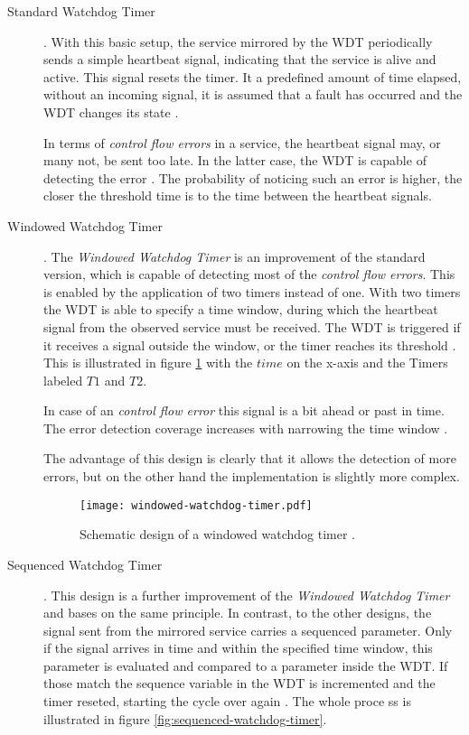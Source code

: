 \begin{description}
\item [Standard Watchdog Timer] .
With this basic setup, the service mirrored by the WDT periodically sends a simple heartbeat signal, indicating that the service is alive and active. This signal resets the timer. It a predefined amount of time elapsed, without an incoming signal, it is assumed that a fault has occurred and the WDT changes its state \cite{elattar2007}.

In terms of \emph{control flow errors} in a service, the heartbeat signal may, or many not, be sent too late. In the latter case, the WDT is capable of detecting the error \cite{elattar2007}. 
The probability of noticing such an error is higher, the closer the threshold time is to the time between the heartbeat signals.

\item [Windowed Watchdog Timer] .
The \emph{Windowed Watchdog Timer} is an improvement of the standard version, which is capable of detecting most of the \emph{control flow errors}. This is enabled by the application of two timers instead of one. With two timers the WDT is able to specify a time window, during which the heartbeat signal from the observed service must be received. The WDT is triggered if it receives a signal outside the window, or the timer reaches its threshold \cite{elattar2007}. This is illustrated in figure \ref{fig:windowed-watchdog-timer} with the $time$ on the x-axis and the Timers labeled $T1$ and $T2$.

In case of an \emph{control flow error} this signal is a bit ahead or past in time. The error detection coverage increases with narrowing the time window \cite{elattar2007}.  

The advantage of this design is clearly that it allows the detection of more errors, but on the other hand the implementation is slightly more complex.

\begin{figure}[ht]
\centering
\caption{Schematic design of a windowed watchdog timer \cite{elattar2007}.}
\label{fig:windowed-watchdog-timer}
\texttt{[image: windowed-watchdog-timer.pdf]}
\end{figure}

\item [Sequenced Watchdog Timer] . 
This design is a further improvement of the \emph{Windowed Watchdog Timer} and bases on the same principle. In contrast, to the other designs, the signal sent from the mirrored service carries a sequenced parameter. Only if the signal arrives in time and within the specified time window, this parameter is evaluated and compared to a parameter inside the WDT. If those match the sequence variable in the WDT is incremented and the timer reseted, starting the cycle over again \cite{elattar2007}.
The whole proce ss is illustrated in figure \ref{fig:sequenced-watchdog-timer}.


\end{description}
